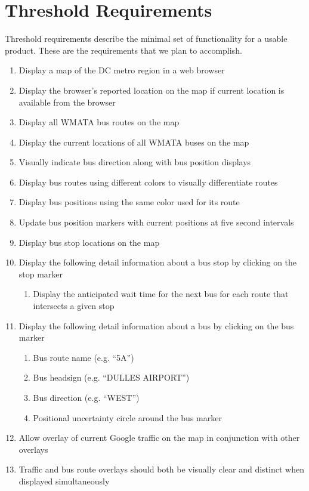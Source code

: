 \documentclass[12pt]{article}
\begin{document}
\section*{Threshold Requirements}
Threshold requirements describe the minimal set of functionality for a usable product.  These are the requirements that we plan to accomplish.
\begin{enumerate}
\item Display a map of the DC metro region in a web browser
\item Display the browser's reported location on the map if current location is available from the browser
\item Display all WMATA bus routes on the map
\item Display the current locations of all WMATA buses on the map
\item Visually indicate bus direction along with bus position displays
\item Display bus routes using different colors to visually differentiate routes
\item Display bus positions using the same color used for its route
\item Update bus position markers with current positions at five second intervals
\item Display bus stop locations on the map
\item Display the following detail information about a bus stop by clicking on the stop marker
\begin{enumerate}
\item Display the anticipated wait time for the next bus for each route that intersects a given stop
\end{enumerate}
\item Display the following detail information about a bus by clicking on the bus marker
\begin{enumerate}
\item Bus route name (e.g. ``5A'')
\item Bus headsign (e.g. ``DULLES AIRPORT'')
\item Bus direction (e.g. ``WEST'')
\item Positional uncertainty circle around the bus marker
\end{enumerate}
\item Allow overlay of current Google traffic on the map in conjunction with other overlays
\item Traffic and bus route overlays should both be visually clear and distinct when displayed simultaneously
\end{enumerate}
\end{document}
